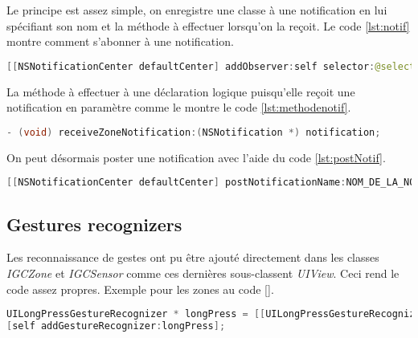 \medskip

Le principe est assez simple, on enregistre une classe à une notification en lui spécifiant son nom et la méthode à effectuer lorsqu'on la reçoit. Le code \ref{lst:notif} montre comment s'abonner à une notification.

\begin{lstlisting}[language={JAVA}, caption={Inscription à une notification}, label={lst:notif}]
[[NSNotificationCenter defaultCenter] addObserver:self selector:@selector(METHODE_A_EFFECTUER:) name:NOM_DE_LA_NOTIF object:nil];
\end{lstlisting}

La méthode à effectuer à une déclaration logique puisqu'elle reçoit une notification en paramètre comme le montre le code \ref{lst:methodenotif}.

\begin{lstlisting}[language={JAVA}, caption={Méthode de notification}, label={lst:methodenotif}]
- (void) receiveZoneNotification:(NSNotification *) notification;
\end{lstlisting}

On peut désormais poster une notification avec l'aide du code \ref{lst:postNotif}.

\begin{lstlisting}[language={JAVA}, caption={Poster une notification}, label={lst:postNotif}]
[[NSNotificationCenter defaultCenter] postNotificationName:NOM_DE_LA_NOTIF object:self];
\end{lstlisting}


\subsection{Gestures recognizers} %
\label{sub:gestures_recognizers}
Les reconnaissance de gestes ont pu être ajouté directement dans les classes \emph{IGCZone} et \emph{IGCSensor} comme ces dernières sous-classent \emph{UIView}. Ceci rend le code assez propres. Exemple pour les zones au code \ref{}.

\begin{lstlisting}[language={JAVA}, caption={Gesture recognizer pour les zones}, label={lst:zonegesture}]
UILongPressGestureRecognizer * longPress = [[UILongPressGestureRecognizer alloc] initWithTarget:self action:@selector(longPressOnZone:)];
[self addGestureRecognizer:longPress];
\end{lstlisting}

